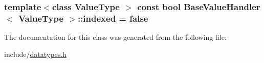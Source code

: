 \subsubsection[{indexed}]{\setlength{\rightskip}{0pt plus 5cm}template$<$class Value\+Type $>$ const bool {\bf Base\+Value\+Handler}$<$ Value\+Type $>$\+::indexed = false\hspace{0.3cm}{\ttfamily [static]}}\label{classBaseValueHandler_a53a7fc222b1aa001cedacec165c58203}


The documentation for this class was generated from the following file\+:\begin{DoxyCompactItemize}
\item 
include/\hyperlink{datatypes_8h}{datatypes.\+h}\end{DoxyCompactItemize}
